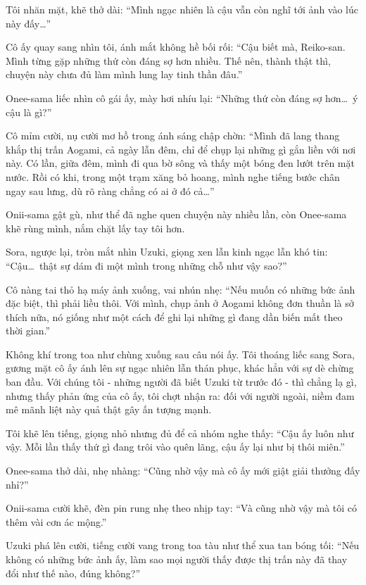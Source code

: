 \documentclass[../main.tex]{subfiles}
\begin{document}

Tôi nhăn mặt, khẽ thở dài: ``Mình ngạc nhiên là cậu vẫn còn nghĩ tới ảnh vào lúc này đấy\dots''

Cô ấy quay sang nhìn tôi, ánh mắt không hề bối rối:
``Cậu biết mà, Reiko-san. Mình từng gặp những thứ còn đáng sợ hơn nhiều. Thế nên, thành thật thì, chuyện này chưa đủ làm mình lung lay tinh thần đâu.''

Onee-sama liếc nhìn cô gái ấy, mày hơi nhíu lại: ``Những thứ còn đáng sợ hơn\dots\ ý cậu là gì?''

Cô mỉm cười, nụ cười mơ hồ trong ánh sáng chập chờn: ``Mình đã lang thang khắp thị trấn Aogami, cả ngày lẫn đêm, chỉ để chụp lại những gì gắn liền với nơi này. Có lần, giữa đêm, mình đi qua bờ sông và thấy một bóng đen lướt trên mặt nước. Rồi có khi, trong một trạm xăng bỏ hoang, mình nghe tiếng bước chân ngay sau lưng, dù rõ ràng chẳng có ai ở đó cả\dots''

Onii-sama gật gù, như thể đã nghe quen chuyện này nhiều lần, còn Onee-sama khẽ rùng mình, nắm chặt lấy tay tôi hơn.

Sora, ngược lại, tròn mắt nhìn Uzuki, giọng xen lẫn kinh ngạc lẫn khó tin: ``Cậu\dots\ thật sự dám đi một mình trong những chỗ như vậy sao?''

Cô nàng tai thỏ hạ máy ảnh xuống, vai nhún nhẹ: ``Nếu muốn có những bức ảnh đặc biệt, thì phải liều thôi. Với mình, chụp ảnh ở Aogami không đơn thuần là sở thích nữa, nó giống như một cách để ghi lại những gì đang dần biến mất theo thời gian.''

Không khí trong toa như chùng xuống sau câu nói ấy. Tôi thoáng liếc sang Sora, gương mặt cô ấy ánh lên sự ngạc nhiên lẫn thán phục, khác hẳn với sự dè chừng ban đầu. Với chúng tôi - những người đã biết Uzuki từ trước đó - thì chẳng lạ gì, nhưng thấy phản ứng của cô ấy, tôi chợt nhận ra: đối với người ngoài, niềm đam mê mãnh liệt này quả thật gây ấn tượng mạnh.

Tôi khẽ lên tiếng, giọng nhỏ nhưng đủ để cả nhóm nghe thấy: ``Cậu ấy luôn như vậy. Mỗi lần thấy thứ gì đang trôi vào quên lãng, cậu ấy lại như bị thôi miên.''

Onee-sama thở dài, nhẹ nhàng: ``Cũng nhờ vậy mà cô ấy mới giật giải thưởng đấy nhỉ?''

Onii-sama cười khẽ, đèn pin rung nhẹ theo nhịp tay: ``Và cũng nhờ vậy mà tôi có thêm vài cơn ác mộng.''

Uzuki phá lên cười, tiếng cười vang trong toa tàu như thể xua tan bóng tối: ``Nếu không có những bức ảnh ấy, làm sao mọi người thấy được thị trấn này đã thay đổi như thế nào, đúng không?''
\end{document}
